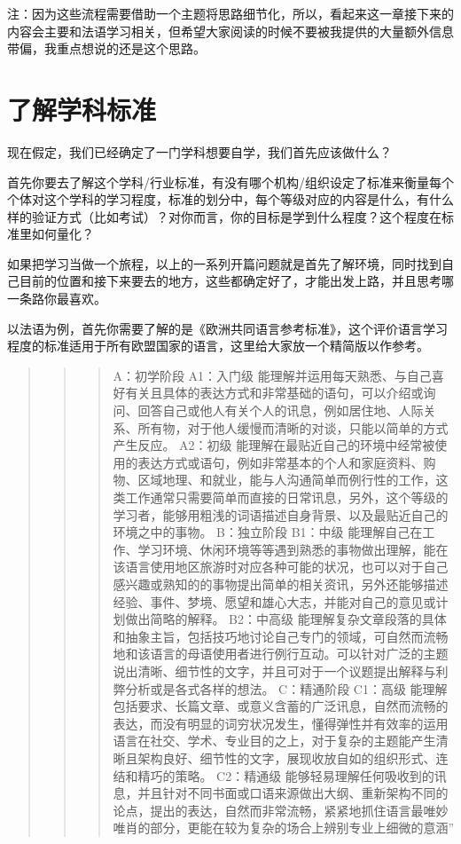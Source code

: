 \documentclass[
]{book}
\begin{document}
注：因为这些流程需要借助一个主题将思路细节化，所以，看起来这一章接下来的内容会主要和法语学习相关，但希望大家阅读的时候不要被我提供的大量额外信息带偏，我重点想说的还是这个思路。

\hypertarget{ux4e86ux89e3ux5b66ux79d1ux6807ux51c6}{%
\section{了解学科标准}\label{ux4e86ux89e3ux5b66ux79d1ux6807ux51c6}}

现在假定，我们已经确定了一门学科想要自学，我们首先应该做什么？

首先你要去了解这个学科/行业标准，有没有哪个机构/组织设定了标准来衡量每个个体对这个学科的学习程度，标准的划分中，每个等级对应的内容是什么，有什么样的验证方式（比如考试）？对你而言，你的目标是学到什么程度？这个程度在标准里如何量化？

如果把学习当做一个旅程，以上的一系列开篇问题就是首先了解环境，同时找到自己目前的位置和接下来要去的地方，这些都确定好了，才能出发上路，并且思考哪一条路你最喜欢。

以法语为例，首先你需要了解的是《欧洲共同语言参考标准》，这个评价语言学习程度的标准适用于所有欧盟国家的语言，这里给大家放一个精简版以作参考。

\begin{quote}
\begin{quote}
\begin{quote}
A：初学阶段
A1：入门级 能理解并运用每天熟悉、与自己喜好有关且具体的表达方式和非常基础的语句，可以介绍或询问、回答自己或他人有关个人的讯息，例如居住地、人际关系、所有物，对于他人缓慢而清晰的对谈，只能以简单的方式产生反应。
A2：初级 能理解在最贴近自己的环境中经常被使用的表达方式或语句，例如非常基本的个人和家庭资料、购物、区域地理、和就业，能与人沟通简单而例行性的工作，这类工作通常只需要简单而直接的日常讯息，另外，这个等级的学习者，能够用粗浅的词语描述自身背景、以及最贴近自己的环境之中的事物。
B：独立阶段
B1：中级 能理解自己在工作、学习环境、休闲环境等等遇到熟悉的事物做出理解，能在该语言使用地区旅游时对应各种可能的状况，也可以对于自己感兴趣或熟知的的事物提出简单的相关资讯，另外还能够描述经验、事件、梦境、愿望和雄心大志，并能对自己的意见或计划做出简略的解释。
B2：中高级 能理解复杂文章段落的具体和抽象主旨，包括技巧地讨论自己专门的领域，可自然而流畅地和该语言的母语使用者进行例行互动。可以针对广泛的主题说出清晰、细节性的文字，并且可对于一个议题提出解释与利弊分析或是各式各样的想法。
C：精通阶段
C1：高级 能理解包括要求、长篇文章、或意义含蓄的广泛讯息，自然而流畅的表达，而没有明显的词穷状况发生，懂得弹性并有效率的运用语言在社交、学术、专业目的之上，对于复杂的主题能产生清晰且架构良好、细节性的文字，展现收放自如的组织形式、连结和精巧的策略。
C2：精通级 能够轻易理解任何吸收到的讯息，并且针对不同书面或口语来源做出大纲、重新架构不同的论点，提出的表达，自然而非常流畅，紧紧地抓住语言最唯妙唯肖的部分，更能在较为复杂的场合上辨别专业上细微的意涵''
\end{quote}
\end{quote}
\end{quote}
\end{document}
